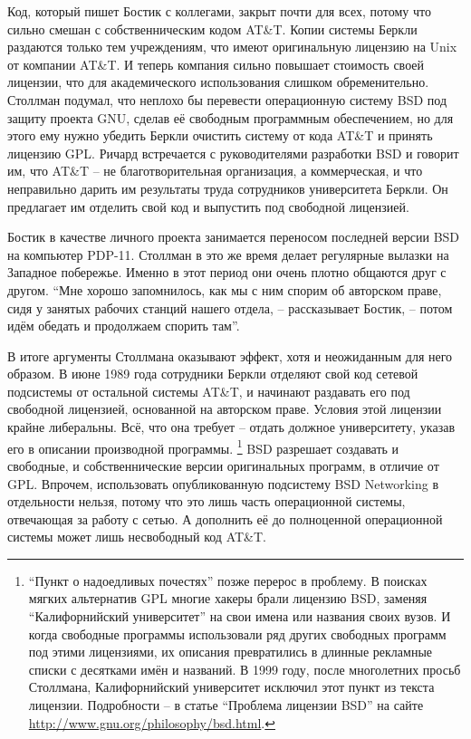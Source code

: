 Код, который пишет Бостик с коллегами, закрыт почти для всех, потому что сильно смешан с собственническим кодом AT\&T. Копии системы Беркли раздаются только тем учреждениям, что имеют оригинальную лицензию на Unix от компании AT\&T. И теперь компания сильно повышает стоимость своей лицензии, что для академического использования слишком обременительно. Столлман подумал, что неплохо бы перевести операционную систему BSD под защиту проекта GNU, сделав её свободным программным обеспечением, но для этого ему нужно убедить Беркли очистить систему от кода AT\&T и принять лицензию GPL. Ричард встречается с руководителями разработки BSD и говорит им, что AT\&T -- не благотворительная организация, а коммерческая, и что неправильно дарить им результаты труда сотрудников университета Беркли. Он предлагает им отделить свой код и выпустить под свободной лицензией.

Бостик в качестве личного проекта занимается переносом последней версии BSD на компьютер PDP-11. Столлман в это же время делает регулярные вылазки на Западное побережье. Именно в этот период они очень плотно общаются друг с другом. \enquote{Мне хорошо запомнилось, как мы с ним спорим об авторском праве, сидя у занятых рабочих станций нашего отдела, -- рассказывает Бостик, -- потом идём обедать и продолжаем спорить там}.

В итоге аргументы Столлмана оказывают эффект, хотя и неожиданным для него образом. В июне 1989 года сотрудники Беркли отделяют свой код сетевой подсистемы от остальной системы AT\&T, и начинают раздавать его под свободной лицензией, основанной на авторском праве. Условия этой лицензии крайне либеральны. Всё, что она требует -- отдать должное университету, указав его в описании производной программы. \footnote{\enquote{Пункт о надоедливых почестях} позже перерос в проблему. В поисках мягких альтернатив GPL многие хакеры брали лицензию BSD, заменяя \enquote{Калифорнийский университет} на свои имена или названия своих вузов. И когда свободные программы использовали ряд других свободных программ под этими лицензиями, их описания превратились в длинные рекламные списки с десятками имён и названий. В 1999 году, после многолетних просьб Столлмана, Калифорнийский университет исключил этот пункт из текста лицензии. Подробности -- в статье \enquote{Проблема лицензии BSD} на сайте \url{http://www.gnu.org/philosophy/bsd.html}.} BSD разрешает создавать и свободные, и собственнические версии оригинальных программ, в отличие от GPL. Впрочем, использовать опубликованную подсистему BSD Networking в отдельности нельзя, потому что это лишь часть операционной системы, отвечающая за работу с сетью. А дополнить её до полноценной операционной системы может лишь несвободный код AT\&T.

